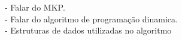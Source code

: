 - Falar do MKP. \\
- Falar do algoritmo de programação dinamica. \\
  - Estruturas de dados utilizadas no algoritmo \\
